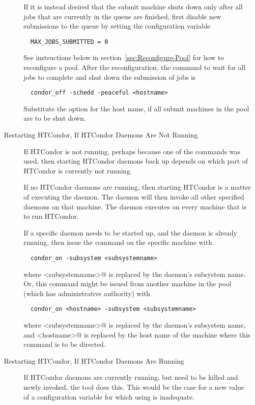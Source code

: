 \begin{description}
If it is instead desired that the submit machine shuts down
only after all jobs that are currently in the queue are finished,
first disable new submissions to the queue 
by setting the configuration variable
\begin{verbatim}
  MAX_JOBS_SUBMITTED = 0
\end{verbatim}
See instructions below in section~\ref{sec:Reconfigure-Pool} for how
to reconfigure a pool.
After the reconfiguration, the command to wait for all jobs to complete
and shut down the submission of jobs is
\begin{verbatim}
  condor_off -schedd -peaceful <hostname>
\end{verbatim}

Substitute the option  for the host name,
if all submit machines in the pool are to be shut down.

\item[Restarting HTCondor, If HTCondor Daemons Are Not Running]
If HTCondor is not running,
perhaps because one of the  commands was used,
then starting HTCondor daemons back up depends on which part of
HTCondor is currently not running.

If no HTCondor daemons are running, then starting HTCondor is a matter
of executing the  daemon.
The  daemon will then invoke all other specified daemons
on that machine.
The  daemon executes on every machine that is to run HTCondor.

If a specific daemon needs to be started up, and the  daemon
is already running, then issue the command on the specific machine with
\begin{verbatim}
  condor_on -subsystem <subsystemname>
\end{verbatim}
where \verb@<subsystemname>@ is replaced by the daemon's subsystem
name.
Or, this command might be issued from another machine in the pool
(which has administrative authority) with
\begin{verbatim}
  condor_on <hostname> -subsystem <subsystemname>
\end{verbatim}
where \verb@<subsystemname>@ is replaced by the daemon's subsystem
name, and \verb@<hostname>@ is replaced by the host name of the
machine where this  command is to be directed.

\item[Restarting HTCondor, If HTCondor Daemons Are Running]
If HTCondor daemons are currently running, but need to be killed and
newly invoked,
the  tool does this.
This would be the case for a new value of a configuration variable for
which using  is inadequate.


\end{description}
